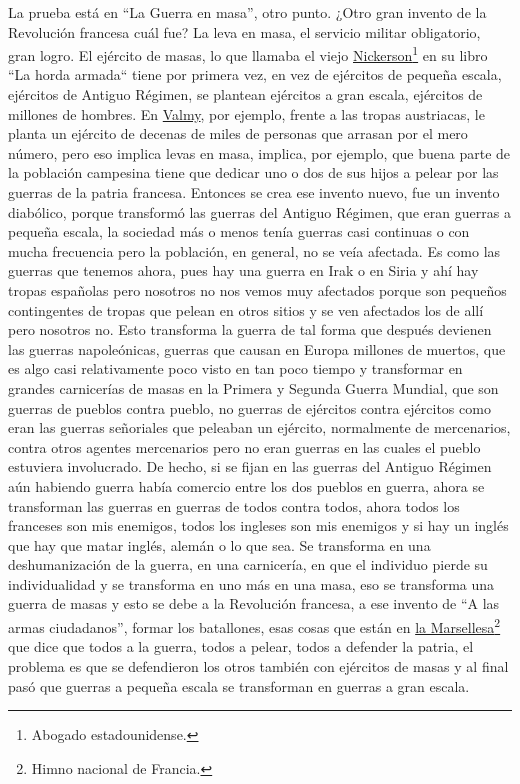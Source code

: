 La prueba está en \enquote{La Guerra en masa}, otro punto. ¿Otro gran invento de la Revolución francesa cuál fue? La leva en masa, el servicio militar obligatorio, gran logro. El ejército de masas, lo que llamaba el viejo \href{https://en.wikipedia.org/wiki/Eugene_Nickerson}{Nickerson}\footnote{Abogado estadounidense.} en su libro ``La horda armada``\cite{nickerson1940armed} tiene por primera vez, en vez de ejércitos de pequeña escala, ejércitos de Antiguo Régimen, se plantean ejércitos a gran escala, ejércitos de millones de hombres. En \href{https://en.wikipedia.org/wiki/Battle_of_Valmy}{Valmy}, por ejemplo, frente a las tropas austriacas, le planta un ejército de decenas de miles de personas que arrasan por el mero número, pero eso implica levas en masa, implica, por ejemplo, que buena parte de la población campesina tiene que dedicar uno o dos de sus hijos a pelear por las guerras de la patria francesa. Entonces se crea ese invento nuevo, fue un invento diabólico, porque transformó las guerras del Antiguo Régimen, que eran guerras a pequeña escala, la sociedad más o menos tenía guerras casi continuas o con mucha frecuencia pero la población, en general, no se veía afectada. Es como las guerras que tenemos ahora, pues hay una guerra en Irak o en Siria y ahí hay tropas españolas pero nosotros no nos vemos muy afectados porque son pequeños contingentes de tropas que pelean en otros sitios y se ven afectados los de allí pero nosotros no. Esto transforma la guerra de tal forma que después devienen las guerras napoleónicas, guerras que causan en Europa millones de muertos, que es algo casi relativamente poco visto en tan poco tiempo y transformar en grandes carnicerías de masas en la Primera y Segunda Guerra Mundial, que son guerras de pueblos contra pueblo, no guerras de ejércitos contra ejércitos como eran las guerras señoriales que peleaban un ejército, normalmente de mercenarios, contra otros agentes mercenarios pero no eran guerras en las cuales el pueblo estuviera involucrado. De hecho, si se fijan en las guerras del Antiguo Régimen aún habiendo guerra había comercio entre los dos pueblos en guerra, ahora se transforman las guerras en guerras de todos contra todos, ahora todos los franceses son mis enemigos, todos los ingleses son mis enemigos y si hay un inglés que hay que matar inglés, alemán o lo que sea. Se transforma en una deshumanización de la guerra, en una carnicería, en que el individuo pierde su individualidad y se transforma en uno más en una masa, eso se transforma una guerra de masas y esto se debe a la Revolución francesa, a ese invento de \enquote{A las armas ciudadanos}, formar los batallones, esas cosas que están en \href{https://en.wikipedia.org/wiki/La_Marseillaise}{la Marsellesa}\footnote{Himno nacional de Francia.} que dice que todos a la guerra, todos a pelear, todos a defender la patria, el problema es que se defendieron los otros también con ejércitos de masas y al final pasó que guerras a pequeña escala se transforman en guerras a gran escala.

